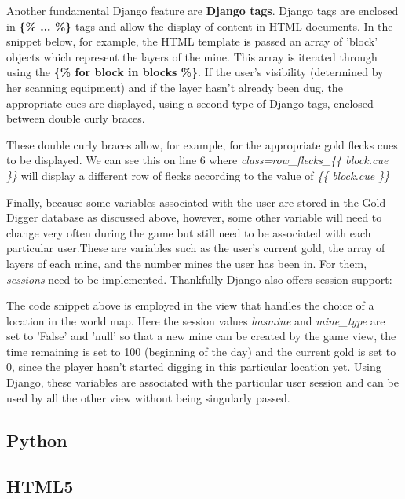 \documentclass{mproj}
\begin{document}
Another fundamental Django feature are \textbf{Django tags}. Django tags are enclosed in \textbf{\{\% ... \%\}} tags and allow the display of content in HTML documents. In the snippet below, for example, the HTML template is passed an array of 'block' objects which represent the layers of the mine. This array is iterated through using the \textbf{\{\% for block in blocks \%\}}.  If the user's visibility (determined by her scanning equipment) and if the layer hasn't already been dug, the appropriate cues are displayed, using a second type of Django tags, enclosed between double curly braces. 



These double curly braces allow, for example, for the appropriate gold flecks cues to be displayed. We can see this on line 6 where \emph{class=row\_flecks\_\{\{ block.cue \}\}} will display a different row of flecks according to the value of \emph{\{\{  block.cue \}\}}

Finally, because some variables associated with the user are stored in the Gold Digger database as discussed above, however, some other variable will need to change very often during the game but still need to be associated with each particular user.These are variables such as the user's current gold, the array of layers of each mine, and the number mines the user has been in. For them,  \textit{sessions} need to be implemented. Thankfully Django also offers session support:



The code snippet above is employed in the view that handles the choice of a location in the world map. Here the session values \textit{hasmine} and \textit{mine\_type} are set to 'False' and 'null' so that a new mine can be created by the game view, the time remaining is set to 100 (beginning of the day) and the current gold is set to 0, since the player hasn't started digging in this particular location yet. Using Django, these variables are associated with the particular user session and can be used by all the other view without being singularly passed.

\label{subsec:Django}
\subsection{Python}
\subsection{HTML5}
\end{document}
